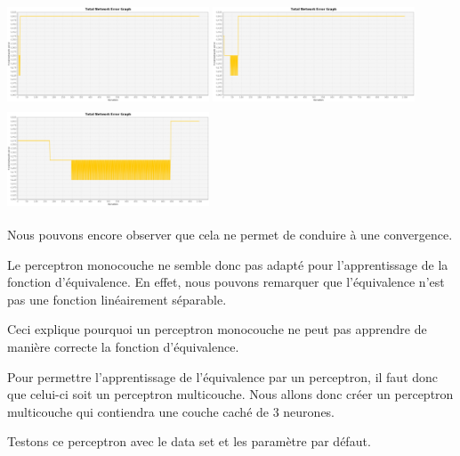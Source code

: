 \documentclass[twoside,openright,a4paper,11pt,french]{article}
\begin{document}
\includegraphics[width=6cm,height=3cm]{./pics/eq/mono_eq_0.1.eps}
\includegraphics[width=6cm,height=3cm]{./pics/eq/mono_eq_0.01.eps}
\includegraphics[width=6cm,height=3cm]{./pics/eq/mono_eq_0.001.eps}

Nous pouvons encore observer que cela ne permet de conduire à une convergence.

Le perceptron monocouche ne semble donc pas adapté pour l'apprentissage de la fonction
d'équivalence. En effet, nous pouvons remarquer que l'équivalence n'est pas une fonction
linéairement séparable.


Ceci explique pourquoi un perceptron monocouche ne peut pas apprendre de manière correcte
la fonction d'équivalence.

Pour permettre l'apprentissage de l'équivalence par un perceptron, il faut donc que
celui-ci soit un perceptron multicouche.
Nous allons donc créer un perceptron multicouche qui contiendra une couche caché de
3 neurones.

Testons ce perceptron avec le data set et les paramètre par défaut.

\end{document}
